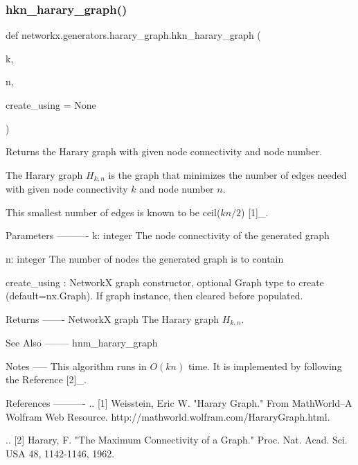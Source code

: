 \subsubsection{\texorpdfstring{hkn\+\_\+harary\+\_\+graph()}{hkn\_harary\_graph()}}
{\footnotesize\ttfamily def networkx.\+generators.\+harary\+\_\+graph.\+hkn\+\_\+harary\+\_\+graph (\begin{DoxyParamCaption}\item[{}]{k,  }\item[{}]{n,  }\item[{}]{create\+\_\+using = {\ttfamily None} }\end{DoxyParamCaption})}

\begin{DoxyVerb}Returns the Harary graph with given node connectivity and node number.

The Harary graph $H_{k,n}$ is the graph that minimizes the number of
edges needed with given node connectivity $k$ and node number $n$.

This smallest number of edges is known to be ceil($kn/2$) [1]_.

Parameters
----------
k: integer
   The node connectivity of the generated graph

n: integer
   The number of nodes the generated graph is to contain

create_using : NetworkX graph constructor, optional Graph type
 to create (default=nx.Graph). If graph instance, then cleared
 before populated.

Returns
-------
NetworkX graph
    The Harary graph $H_{k,n}$.

See Also
--------
hnm_harary_graph

Notes
-----
This algorithm runs in $O(kn)$ time.
It is implemented by following the Reference [2]_.

References
----------
.. [1] Weisstein, Eric W. "Harary Graph." From MathWorld--A Wolfram Web
 Resource. http://mathworld.wolfram.com/HararyGraph.html.

.. [2] Harary, F. "The Maximum Connectivity of a Graph."
  Proc. Nat. Acad. Sci. USA 48, 1142-1146, 1962.
\end{DoxyVerb}
 \mbox{\label{namespacenetworkx_1_1generators_1_1harary__graph_ae71edf076049d1048379a89df26c1f63}} 
